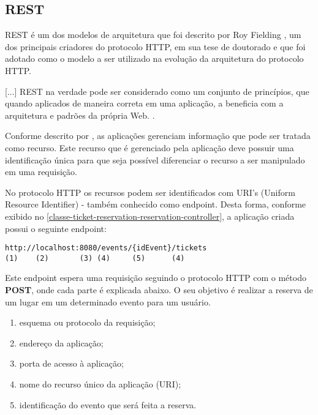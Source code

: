 \subsection{REST}\label{rest}

\begin{citacao}

REST é um dos modelos de arquitetura que foi descrito por
Roy Fielding \cite[5]{rest-roy-thomas-fielding},
um dos principais criadores do protocolo HTTP, em sua tese de doutorado
e que foi adotado como o modelo a ser utilizado na evolução da arquitetura
do protocolo HTTP.

[...] REST na verdade pode ser considerado como um conjunto de princípios,
que quando aplicados de maneira correta em uma aplicação, a beneficia com a
arquitetura e padrões da própria Web. \cite{rest-principios-e-boas-praticas}.

\end{citacao}

Conforme descrito por \cite{rest-principios-e-boas-praticas}, as aplicações
gerenciam informação que pode ser tratada como recurso. Este recurso que é
gerenciado pela aplicação deve possuir uma identificação única para que seja
possível diferenciar o recurso a ser manipulado em uma requisição.

No protocolo HTTP os recursos podem ser identificados com
URI's (Uniform Resource Identifier) - também conhecido como endpoint.
Desta forma, conforme exibido no \autoref{classe-ticket-reservation-reservation-controller},
a aplicação criada possui o seguinte endpoint:

\begin{minipage}{\linewidth}
\begin{lstlisting}[basicstyle=\ttfamily]
http://localhost:8080/events/{idEvent}/tickets
(1)    (2)       (3) (4)     (5)      (4)
\end{lstlisting}
\end{minipage}

Este endpoint espera uma requisição seguindo o protocolo HTTP
com o método \textbf{POST}, onde cada parte é explicada abaixo. O seu objetivo é
realizar a reserva de um lugar em um determinado evento para um usuário.

\begin{enumerate}

  \item esquema ou protocolo da requisição;

  \item endereço da aplicação;

  \item porta de acesso à aplicação;

  \item nome do recurso único da aplicação (URI);

  \item identificação do evento que será feita a reserva.

\end{enumerate}
